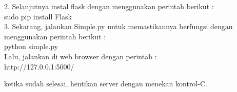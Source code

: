\documentclass[12pt,a4paper]{article}
\begin{document}
\begin{enumerate}
2. Selanjutnya instal flask dengan menggunakan perintah berikut :\\
	sudo pip install Flask\\

3. Sekarang, jalankan Simple.py untuk memastikannya berfungsi dengan menggunakan perintah berikut :\\
	python simple.py\\

Lalu, jalankan di web browser dengan perintah :\\
http://127.0.0.1:5000/

ketika sudah selesai, hentikan server dengan menekan kontrol-C.



\end{enumerate}
\end{document}
